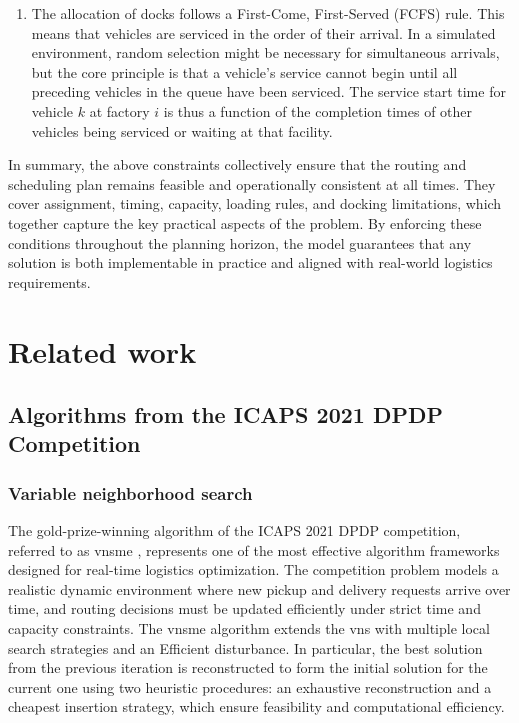 \documentclass[]{interact}
\begin{document}
\begin{enumerate}
    \item The allocation of docks follows a First-Come, First-Served (FCFS) rule. This means that vehicles are serviced in the order of their arrival. In a simulated environment, random selection might be necessary for simultaneous arrivals, but the core principle is that a vehicle's service cannot begin until all preceding vehicles in the queue have been serviced. The service start time for vehicle $k$ at factory $i$ is thus a function of the completion times of other vehicles being serviced or waiting at that facility.
    
\end{enumerate}

In summary, the above constraints collectively ensure that the routing and scheduling plan remains feasible and operationally consistent at all times. They cover assignment, timing, capacity, loading rules, and docking limitations, which together capture the key practical aspects of the problem. By enforcing these conditions throughout the planning horizon, the model guarantees that any solution is both implementable in practice and aligned with real-world logistics requirements.

\section{Related work}\label{sec:related}
\subsection{Algorithms from the ICAPS 2021 DPDP Competition}
\subsubsection{Variable neighborhood search}
The gold-prize-winning algorithm of the ICAPS 2021 DPDP competition, referred to as \gls{vnsme} \cite{cai2022variable}, represents one of the most effective algorithm frameworks designed for real-time logistics optimization. The competition problem models a realistic dynamic environment where new pickup and delivery requests arrive over time, and routing decisions must be updated efficiently under strict time and capacity constraints. The \gls{vnsme} algorithm extends the \gls{vns} with multiple local search strategies and an Efficient disturbance. In particular, the best solution from the previous iteration is reconstructed to form the initial solution for the current one using two heuristic procedures: an exhaustive reconstruction and a cheapest insertion strategy, which ensure feasibility and computational efficiency.
\end{document}
